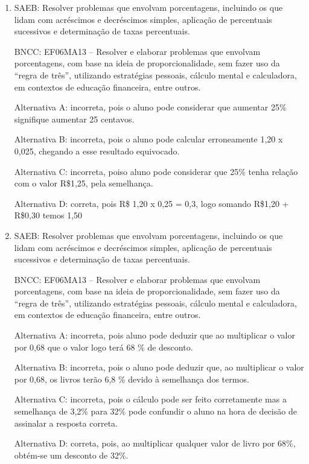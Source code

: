 
	\begin{enumerate}

		\item SAEB: Resolver problemas que envolvam porcentagens, incluindo os que
lidam com acréscimos e decréscimos simples, aplicação de percentuais
sucessivos e determinação de taxas percentuais.

BNCC: EF06MA13 -- Resolver e elaborar problemas que envolvam
porcentagens, com base na ideia de proporcionalidade, sem fazer uso da
``regra de três'', utilizando estratégias pessoais, cálculo mental e
calculadora, em contextos de educação financeira, entre outros.

Alternativa A: incorreta, pois o aluno pode considerar que aumentar 25\%
signifique aumentar 25 centavos.

Alternativa B: incorreta, pois o aluno pode calcular erroneamente 1,20 x
0,025, chegando a esse resultado equivocado.

Alternativa C: incorreta, poiso aluno pode considerar que 25\% tenha
relação com o valor R\$1,25, pela semelhança.

Alternativa D: correta, pois R\$ 1,20 x 0,25 = 0,3, logo somando R\$1,20
+ R\$0,30 temos 1,50

		\item SAEB: Resolver problemas que envolvam porcentagens, incluindo os que
lidam com acréscimos e decréscimos simples, aplicação de percentuais
sucessivos e determinação de taxas percentuais.

BNCC: EF06MA13 -- Resolver e elaborar problemas que envolvam
porcentagens, com base na ideia de proporcionalidade, sem fazer uso da
``regra de três'', utilizando estratégias pessoais, cálculo mental e
calculadora, em contextos de educação financeira, entre outros.

Alternativa A: incorreta, pois aluno pode deduzir que ao multiplicar o
valor por 0,68 que o valor logo terá 68 \% de desconto.

Alternativa B: incorreta, pois o aluno pode deduzir que, ao multiplicar
o valor por 0,68, os livros terão 6,8 \% devido à semelhança dos termos.

Alternativa C: incorreta, pois o cálculo pode ser feito corretamente mas
a semelhança de 3,2\% para 32\% pode confundir o aluno na hora de
decisão de assinalar a resposta correta.

Alternativa D: correta, pois, ao multiplicar qualquer valor de livro por
68\%, obtém-se um desconto de 32\%.


\end{enumerate}
